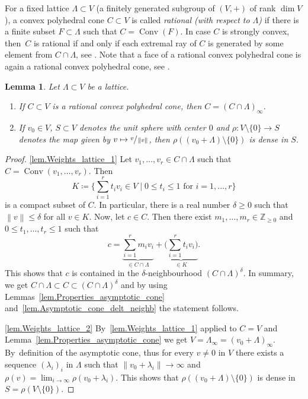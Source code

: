 \documentclass[JEP,XML,SOM,Unicode]{cedram}
\def\mto{\mathchoice{\longmapsto}{\mapsto}{\mapsto}{\mapsto}}
\theoremstyle{plain}
\newtheorem{lemma}[theorem]{Lemma}
\theoremstyle{definition}
\DeclareMathOperator{\Conv}{Conv}
\newcommand{\norm}[1]{\left\lVert#1\right\rVert}
\newcommand{\ZZ}{\mathbb{Z}}
\newcommand{\bset}[2]{\bigl\{#1 \mid #2\bigr\}}
\begin{document}
For a fixed lattice $\Lambda \subset V$ (\ie a finitely generated subgroup of $(V, +)$ of rank $\dim V$),
a convex polyhedral cone $C \subset V$
is called \emph{rational (with respect to $\Lambda$)} if there is a finite subset $F \subset \Lambda$
such that $C = \Conv(F)$. In case $C$ is strongly convex, then~$C$ is rational if and only if
each extremal ray of $C$ is generated
by some element from $C \cap \Lambda$, see \cite[p.\,14]{Fu1993Introduction-to-to}.
Note that a face of a rational convex polyhedral cone
is again a rational convex polyhedral cone, see \cite[Prop.\,2]{Fu1993Introduction-to-to}.

\begin{lemma}
\label{lem.Weights_lattice}
Let $\Lambda \subset V$ be a lattice.
\begin{enumerate}
\item \label{lem.Weights_lattice_1} If $C \subset V$ is a rational convex
polyhedral cone, then $C = (C \cap \Lambda)_{\infty}$.
\item \label{lem.Weights_lattice_2} If $v_0 \in V$, $S \subset V$ denotes the unit sphere with center $0$ and
$\rho \colon V \setminus \{0\} \to S$ denotes the map given by $v \mto \sfrac{v}{\norm{v}}$,
then $\rho((v_0 + \Lambda) \setminus \{0\})$ is dense in $S$.
\end{enumerate}
\end{lemma}

\skpt
\begin{proof}
\eqref{lem.Weights_lattice_1}
Let $v_1, \ldots, v_r \in C \cap \Lambda$ such that $C = \Conv(v_1, \ldots, v_r)$. Then
\[
K\coloneqq\bset{\textstyle\sum_{i=1}^r t_i v_i \in V}{\textrm{$0 \leq t_i \leq 1$ for $i=1, \ldots, r$}}
\]
is a compact subset of $C$. In particular, there is a real number $\delta \geq 0$ such that
$\norm{v} \leq \delta$ for all $v \in K$. Now, let $c \in C$. Then there exist
$m_1, \ldots, m_r \in \ZZ_{\geq 0}$ and $0 \leq t_1, \ldots, t_r \leq 1$ such that
\[
c = \underbrace{\sum_{i=1}^r m_i v_i}_{\in C \cap \Lambda} +
\underbrace{\biggl(\sum_{i=1}^r t_i v_i \biggr)}_{\in K}.
\]
This shows that $c$ is contained in the $\delta$-neighbourhood $(C \cap \Lambda)^\delta$. In
summary, we get $C \cap \Lambda \subset C \subset (C \cap \Lambda)^\delta$ and by
using Lemmas~\ref{lem.Properties_asymptotic_cone} and~\ref{lem.Asymptotic_cone_delt_neighb}
the statement follows.

\eqref{lem.Weights_lattice_2}
By~\eqref{lem.Weights_lattice_1} applied to $C = V$ and
Lemma~\ref{lem.Properties_asymptotic_cone} we get
$V = \Lambda_{\infty} = (v_0 + \Lambda)_{\infty}$. By~definition of the asymptotic cone, thus
for every $v \neq 0$ in $V$ there exists a sequence $(\lambda_i)_i$ in $\Lambda$ such that
$\norm{v_0 + \lambda_i} \to \infty$ and
$\rho(v) = \lim_{i \to \infty} \rho(v_0 + \lambda_i)$.
This shows that $\rho((v_0 + \Lambda) \setminus \{0\})$ is dense in $S = \rho(V \setminus \{0\})$.
\end{proof}
\end{document}
